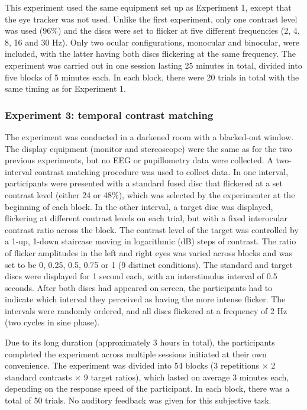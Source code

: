 \documentclass[
]{article}
\begin{document}
This experiment used the same equipment set up as Experiment 1, except that the eye tracker was not used. Unlike the first experiment, only one contrast level was used (96\%) and the discs were set to flicker at five different frequencies (2, 4, 8, 16 and 30 Hz). Only two ocular configurations, monocular and binocular, were included, with the latter having both discs flickering at the same frequency. The experiment was carried out in one session lasting 25 minutes in total, divided into five blocks of 5 minutes each. In each block, there were 20 trials in total with the same timing as for Experiment 1.

\hypertarget{experiment-3-temporal-contrast-matching}{%
\subsubsection{Experiment 3: temporal contrast matching}\label{experiment-3-temporal-contrast-matching}}

The experiment was conducted in a darkened room with a blacked-out window. The display equipment (monitor and stereoscope) were the same as for the two previous experiments, but no EEG or pupillometry data were collected. A two-interval contrast matching procedure was used to collect data. In one interval, participants were presented with a standard fused disc that flickered at a set contrast level (either 24 or 48\%), which was selected by the experimenter at the beginning of each block. In the other interval, a target disc was displayed, flickering at different contrast levels on each trial, but with a fixed interocular contrast ratio across the block. The contrast level of the target was controlled by a 1-up, 1-down staircase moving in logarithmic (dB) steps of contrast. The ratio of flicker amplitudes in the left and right eyes was varied across blocks and was set to be 0, 0.25, 0.5, 0.75 or 1 (9 distinct conditions). The standard and target discs were displayed for 1 second each, with an interstimulus interval of 0.5 seconds. After both discs had appeared on screen, the participants had to indicate which interval they perceived as having the more intense flicker. The intervals were randomly ordered, and all discs flickered at a frequency of 2 Hz (two cycles in sine phase).

Due to its long duration (approximately 3 hours in total), the participants completed the experiment across multiple sessions initiated at their own convenience. The experiment was divided into 54 blocks (3 repetitions \(\times\) 2 standard contrasts \(\times\) 9 target ratios), which lasted on average 3 minutes each, depending on the response speed of the participant. In each block, there was a total of 50 trials. No auditory feedback was given for this subjective task.
\end{document}
